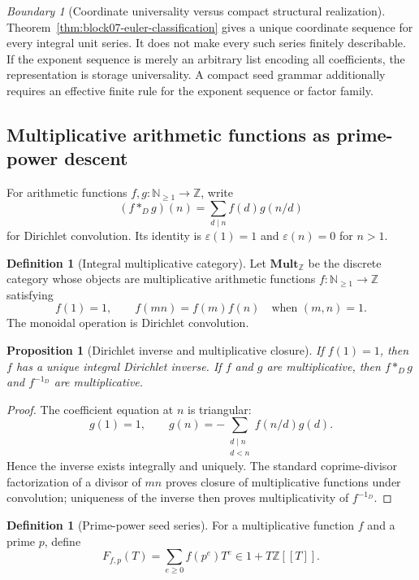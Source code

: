 \documentclass[11pt]{article}
\newtheorem{proposition}[theorem]{Proposition}
\theoremstyle{definition}
\newtheorem{definition}[theorem]{Definition}
\theoremstyle{remark}
\newtheorem{boundary}[theorem]{Boundary}
\begin{document}
\begin{boundary}[Coordinate universality versus compact structural realization]
\label{bnd:block07-storage-universality}
Theorem~\ref{thm:block07-euler-classification} gives a unique coordinate sequence for every integral unit series.  It does not make every such series finitely describable.  If the exponent sequence is merely an arbitrary list encoding all coefficients, the representation is storage universality.  A compact seed grammar additionally requires an effective finite rule for the exponent sequence or factor family.
\end{boundary}

\subsection{Multiplicative arithmetic functions as prime-power descent}

For arithmetic functions $f,g:\mathbb N_{\geq1}\to\mathbb Z$, write
\[
(f\mathbin{\ast_D}g)(n)
=
\sum_{d\mid n}f(d)g(n/d)
\]
for Dirichlet convolution.  Its identity is $\varepsilon(1)=1$ and $\varepsilon(n)=0$ for $n>1$.

\begin{definition}[Integral multiplicative category]
Let $\mathbf{Mult}_{\mathbb Z}$ be the discrete category whose objects are multiplicative arithmetic functions $f:\mathbb N_{\geq1}\to\mathbb Z$ satisfying
\[
f(1)=1,
\qquad
f(mn)=f(m)f(n)
\quad\text{when }(m,n)=1.
\]
The monoidal operation is Dirichlet convolution.
\end{definition}

\begin{proposition}[Dirichlet inverse and multiplicative closure]
If $f(1)=1$, then $f$ has a unique integral Dirichlet inverse.  If $f$ and $g$ are multiplicative, then $f\mathbin{\ast_D}g$ and $f^{-1_D}$ are multiplicative.
\end{proposition}

\begin{proof}
The coefficient equation at $n$ is triangular:
\[
g(1)=1,
\qquad
g(n)=-\sum_{\substack{d\mid n\\d<n}}f(n/d)g(d).
\]
Hence the inverse exists integrally and uniquely.  The standard coprime-divisor factorization of a divisor of $mn$ proves closure of multiplicative functions under convolution; uniqueness of the inverse then proves multiplicativity of $f^{-1_D}$.
\end{proof}

\begin{definition}[Prime-power seed series]
For a multiplicative function $f$ and a prime $p$, define
\[
F_{f,p}(T)
=
\sum_{e\geq0}f(p^e)T^e
\in1+T\mathbb Z[[T]].
\]
\end{definition}
\end{document}
